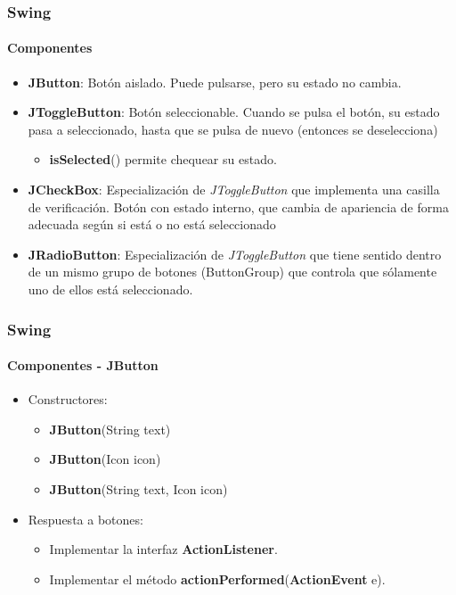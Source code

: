 \documentclass{beamer}
\begin{document}
    \begin{frame}
		\frametitle{Swing}
		\framesubtitle{Componentes}

        \begin{itemize}
		    \item[\checkmark] \textbf{JButton}: Bot\'on aislado. Puede pulsarse, pero su estado no cambia.
		    \item[\checkmark] \textbf{JToggleButton}: Bot\'on seleccionable. Cuando se pulsa el bot\'on, su estado pasa a seleccionado, hasta que se pulsa de nuevo (entonces se deselecciona)
		    \begin{itemize}
        		    \item[] \textbf{isSelected}() permite chequear su estado.
	    	    \end{itemize}
		    \item[\checkmark] \textbf{JCheckBox}: Especializaci\'on de \emph{JToggleButton} que implementa una casilla de verificaci\'on. Bot\'on con estado interno, que cambia de apariencia de forma adecuada seg\'un si est\'a o no est\'a seleccionado
		    \item[\checkmark] \textbf{JRadioButton}: Especializaci\'on de \emph{JToggleButton} que tiene sentido dentro de un mismo grupo de botones (ButtonGroup) que controla que s\'olamente uno de ellos est\'a seleccionado.
		\end{itemize}
	\end{frame}	

    \begin{frame}
		\frametitle{Swing}
		\framesubtitle{Componentes - JButton}

        \begin{itemize}
		    \item[\checkmark] Constructores:
		    \begin{itemize}
        		    \item[] \textbf{JButton}(String text)
        		    \item[] \textbf{JButton}(Icon icon)
        		    \item[] \textbf{JButton}(String text, Icon icon)
	    	    \end{itemize}
		\end{itemize}

        \begin{itemize}
		    \item[\checkmark] Respuesta a botones:
		    \begin{itemize}
        		    \item[] Implementar la interfaz \textbf{ActionListener}.
        		    \item[] Implementar el m\'etodo \textbf{actionPerformed}(\textbf{ActionEvent} e).
	    	    \end{itemize}
		\end{itemize}
	\end{frame}	
	
\end{document}
